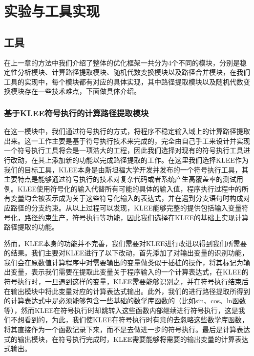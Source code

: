 \chapter{实验与工具实现}\label{chapter_experiment}

\section{工具}

在上一章的方法中我们介绍了整体的优化框架一共分为4个不同的模块，分别是稳定性分析模块、计算路径提取模块、随机代数变换模块以及路径合并模块，在我们工具的实现中，每个模块都有对应的具体实现，其中路径提取模块以及随机代数变换模块存在一些技术难点，下面做具体介绍。

\subsection{基于KLEE符号执行的计算路径提取模块}

在这一模块中，我们通过符号执行的方式，将程序不稳定输入域上的计算路径提取出来。这一工作主要是基于符号执行技术来完成的，完全由自己手工来设计并实现一个符号执行工具将会是一项浩大的工程，因此我们选择对现有的符号执行工具进行改动，在其上添加新的功能以完成路径提取的工作。在这里我们选择KLEE作为我们的目标工具，KLEE本身是由斯坦福大学开发并发布的一个符号执行工具，其主要特点是能够通过符号执行的技术对复杂代码或者系统产生高覆盖率的测试用例。KLEE使用符号化的输入代替所有可能的具体的输入值，程序执行过程中的所有变量均会被表示成为关于这些符号化输入的表达式，并在遇到分支语句时构成对应路径的分支约束。从以上过程可以发现，KLEE能够完整的提供包括输入变量符号化，路径约束生产，符号执行等功能，因此我们选择在KLEE的基础上实现计算路径提取的功能。

然而，KLEE本身的功能并不完善，我们需要对KLEE进行改进以得到我们所需要的结果。我们主要对KLEE进行了以下改动，首先添加了对输出变量的识别功能，我们会在原数值计算程序中对需要输出的变量做类似于插桩的操作，将其标记为输出变量，表示我们需要在提取此变量关于程序输入的一个计算表达式，在KLEE的符号执行时，一旦遇到这样的变量，KLEE需要能够识别之，并在符号执行结束后在输出模块中将此变量对应的计算表达式输出。此外，我们的进行路径提取所得到的计算表达式中是必须能够包含一些基础的数学库函数的（比如sin、cos、ln函数等），然而KLEE在符号执行时却跳转入这些函数内部继续进行符号执行，这是我们不想看到的，为此，我们使KLEE在符号执行时有意的去忽略这些数学库函数，将其直接作为一个函数记录下来，而不是去做进一步的符号执行。最后是计算表达式的输出模块，在符号执行完成时，KLEE需要能够将需要的输出变量的计算表达式输出。

